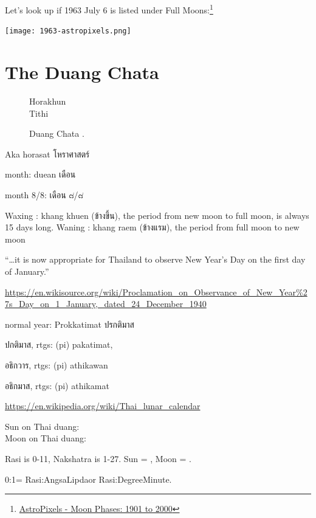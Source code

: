 \documentclass[11pt,oneside]{memoir-article}
\begin{document}
Let's look up if 1963 July 6 is listed under Full Moons:\footnote{\href{http://astropixels.com/ephemeris/phasescat/phases1901.html}{AstroPixels - Moon Phases: 1901 to 2000}}

{\centering
\texttt{[image: 1963-astropixels.png]}
\par}

\label{calculating-the-sun-and-moon-end}

\clearpage

\chapter{The Duang Chata}
\label{sec-6}
\label{duangchata}

\begin{figure}[h]
\caption{Duang Chata .}
\resizebox{\linewidth}{!}{\DuangChata[Sun={2/0/0}, Moon={4/5/10}, fancy]}

Horakhun\\
Tithi

\end{figure}

Aka horasat โหราศาสตร์

month: duean เดือน

month 8/8: เดือน ๘/๘

Waxing : khang khuen (ข้างขึ้น), the period from new moon to full moon, is always 15 days long.
Waning : khang raem (ข้างแรม), the period from full moon to new moon

``\ldots{}it is now appropriate for Thailand to observe New Year's Day on the first day of January.''

\url{https://en.wikisource.org/wiki/Proclamation_on_Observance_of_New_Year\%27s_Day_on_1_January,_dated_24_December_1940}

normal year: Prokkatimat ปรกติมาส

ปกติมาส, rtgs: (pi) pakatimat,

อธิกวาร, rtgs: (pi) athikawan

อธิกมาส, rtgs: (pi) athikamat

\url{https://en.wikipedia.org/wiki/Thai_lunar_calendar}

Sun on Thai duang: \\
Moon on Thai duang: 

Rasi is 0-11, Nakshatra is 1-27. Sun = \theSun, Moon = \theMoon.

0:1\minute = Rasi:Angsa\degree Lipda\minute or Rasi:Degree\degree Minute\minute.
\end{document}
